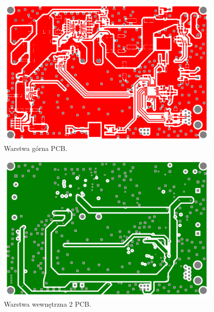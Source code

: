 \begin{figure}
    \begin{center}
        \includegraphics[width = 15cm]{zalaczniki/zasilacz/Zasilacz_regulowany_Strona_09.jpg}
        \caption{Warstwa górna PCB.}
    \end{center}
\end{figure}

\begin{figure}
    \begin{center}
        \includegraphics[width = 15cm]{zalaczniki/zasilacz/Zasilacz_regulowany_Strona_10.jpg}
        \caption{Warstwa wewnętrzna 2 PCB.}
    \end{center}
\end{figure}

